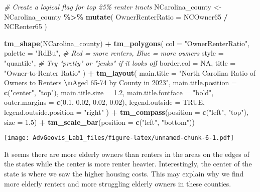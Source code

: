 \documentclass[
]{article}
\newenvironment{Shaded}{\begin{snugshade}}{\end{snugshade}}
\newcommand{\AttributeTok}[1]{\textcolor[rgb]{0.13,0.29,0.53}{#1}}
\newcommand{\CommentTok}[1]{\textcolor[rgb]{0.56,0.35,0.01}{\textit{#1}}}
\newcommand{\ConstantTok}[1]{\textcolor[rgb]{0.56,0.35,0.01}{#1}}
\newcommand{\FloatTok}[1]{\textcolor[rgb]{0.00,0.00,0.81}{#1}}
\newcommand{\FunctionTok}[1]{\textcolor[rgb]{0.13,0.29,0.53}{\textbf{#1}}}
\newcommand{\NormalTok}[1]{#1}
\newcommand{\OtherTok}[1]{\textcolor[rgb]{0.56,0.35,0.01}{#1}}
\newcommand{\SpecialCharTok}[1]{\textcolor[rgb]{0.81,0.36,0.00}{\textbf{#1}}}
\newcommand{\StringTok}[1]{\textcolor[rgb]{0.31,0.60,0.02}{#1}}
\begin{document}
\begin{Shaded}
\begin{Highlighting}[]
\CommentTok{\# Create a logical flag for top 25\% renter tracts}
\NormalTok{NCarolina\_county }\OtherTok{\textless{}{-}}\NormalTok{ NCarolina\_county }\SpecialCharTok{\%\textgreater{}\%}
  \FunctionTok{mutate}\NormalTok{(}
    \AttributeTok{OwnerRenterRatio =}\NormalTok{ NCOwner65 }\SpecialCharTok{/}\NormalTok{ NCRenter65}
\NormalTok{  )}

\FunctionTok{tm\_shape}\NormalTok{(NCarolina\_county) }\SpecialCharTok{+}
  \FunctionTok{tm\_polygons}\NormalTok{(}
    \AttributeTok{col =} \StringTok{"OwnerRenterRatio"}\NormalTok{,}
    \AttributeTok{palette =} \StringTok{"RdBu"}\NormalTok{,         }\CommentTok{\# Red = more renters, Blue = more owners}
    \AttributeTok{style =} \StringTok{"quantile"}\NormalTok{,       }\CommentTok{\# Try "pretty" or "jenks" if it looks off}
    \AttributeTok{border.col =} \ConstantTok{NA}\NormalTok{,}
    \AttributeTok{title =} \StringTok{"Owner{-}to{-}Renter Ratio"}
\NormalTok{  ) }\SpecialCharTok{+}
  \FunctionTok{tm\_layout}\NormalTok{(}
    \AttributeTok{main.title =} \StringTok{"North Carolina Ratio of Owners to Renters }\SpecialCharTok{\textbackslash{}n}\StringTok{Aged 65{-}74 by County in 2023"}\NormalTok{,}
    \AttributeTok{main.title.position =} \FunctionTok{c}\NormalTok{(}\StringTok{"center"}\NormalTok{, }\StringTok{"top"}\NormalTok{),}
    \AttributeTok{main.title.size =} \FloatTok{1.2}\NormalTok{,}
    \AttributeTok{main.title.fontface =} \StringTok{"bold"}\NormalTok{,}
    \AttributeTok{outer.margins =} \FunctionTok{c}\NormalTok{(}\FloatTok{0.1}\NormalTok{, }\FloatTok{0.02}\NormalTok{, }\FloatTok{0.02}\NormalTok{, }\FloatTok{0.02}\NormalTok{),}
    \AttributeTok{legend.outside =} \ConstantTok{TRUE}\NormalTok{,}
    \AttributeTok{legend.outside.position =} \StringTok{"right"}
\NormalTok{  ) }\SpecialCharTok{+}
    \FunctionTok{tm\_compass}\NormalTok{(}\AttributeTok{position =} \FunctionTok{c}\NormalTok{(}\StringTok{"left"}\NormalTok{, }\StringTok{"top"}\NormalTok{), }\AttributeTok{size =} \FloatTok{1.5}\NormalTok{) }\SpecialCharTok{+}
    \FunctionTok{tm\_scale\_bar}\NormalTok{(}\AttributeTok{position =} \FunctionTok{c}\NormalTok{(}\StringTok{"left"}\NormalTok{, }\StringTok{"bottom"}\NormalTok{))}
\end{Highlighting}
\end{Shaded}

\texttt{[image: AdvGeovis\_Lab1\_files/figure-latex/unnamed-chunk-6-1.pdf]}

It seems there are more elderly owners than renters in the areas on the
edges of the states while the center is more renter heavier.
Interestingly, the center of the state is where we saw the higher
housing costs. This may explain why we find more elderly renters and
more struggling elderly owners in these counties.
\end{document}
